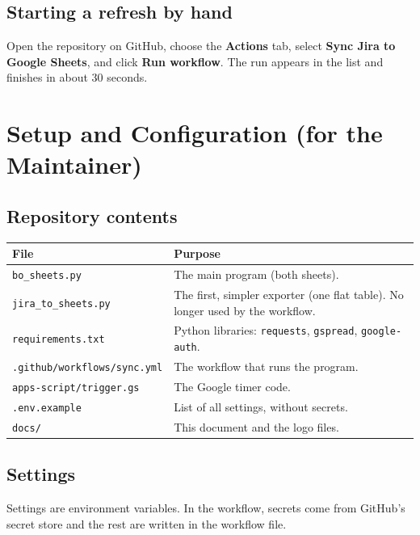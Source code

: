\documentclass[11pt,a4paper]{article}
\newcommand{\code}[1]{\texttt{#1}}
\let\oldsection\section
\renewcommand{\section}{\needspace{12\baselineskip}\oldsection}
\let\oldsubsection\subsection
\renewcommand{\subsection}{\needspace{7\baselineskip}\oldsubsection}
\begin{document}
\subsection{Starting a refresh by hand}
\label{sec:manual}
Open the repository on GitHub, choose the \textbf{Actions} tab, select \textbf{Sync Jira to Google Sheets}, and click
\textbf{Run workflow}. The run appears in the list and finishes in about 30 seconds.

\section{Setup and Configuration (for the Maintainer)}

\subsection{Repository contents}
\begin{tabularx}{\linewidth}{@{}l L@{}}
\toprule
\textbf{File} & \textbf{Purpose} \\
\midrule
\code{bo\_sheets.py} & The main program (both sheets). \\
\code{jira\_to\_sheets.py} & The first, simpler exporter (one flat table). No longer used by the workflow. \\
\code{requirements.txt} & Python libraries: \code{requests}, \code{gspread}, \code{google-auth}. \\
\code{.github/workflows/sync.yml} & The workflow that runs the program. \\
\code{apps-script/trigger.gs} & The Google timer code. \\
\code{.env.example} & List of all settings, without secrets. \\
\code{docs/} & This document and the logo files. \\
\bottomrule
\end{tabularx}

\subsection{Settings}
Settings are environment variables. In the workflow, secrets come from GitHub's secret store and the rest are written in
the workflow file.
\end{document}
